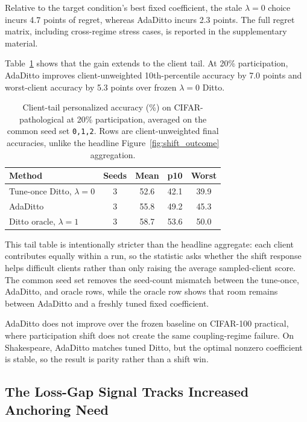 \documentclass[letterpaper]{article} %
\begin{document}
Relative to the target condition's best fixed coefficient, the stale
$\lambda=0$ choice incurs 4.7 points of regret, whereas AdaDitto
incurs 2.3 points. The full regret matrix, including cross-regime
stress cases, is reported in the supplementary material.

Table~\ref{tab:client-tail} shows that the gain extends to the client
tail. At 20\% participation,
AdaDitto improves client-unweighted 10th-percentile accuracy by
7.0 points and worst-client accuracy by 5.3 points over frozen
$\lambda=0$ Ditto.

\begin{table}[t]
\centering
\scriptsize
\setlength{\tabcolsep}{4pt}
\renewcommand{\arraystretch}{1.08}
\begin{tabularx}{\columnwidth}{@{}>{\raggedright\arraybackslash}Xcccc@{}}
\toprule
Method & Seeds & Mean & p10 & Worst \\
\midrule
Tune-once Ditto, $\lambda=0$ & 3 & 52.6 & 42.1 & 39.9 \\
AdaDitto & 3 & 55.8 & 49.2 & 45.3 \\
Ditto oracle, $\lambda=1$ & 3 & 58.7 & 53.6 & 50.0 \\
\bottomrule
\end{tabularx}
\caption{Client-tail personalized accuracy (\%) on CIFAR-pathological at 20\% participation, averaged on the common seed set \texttt{0,1,2}. Rows are client-unweighted final accuracies, unlike the headline Figure~\ref{fig:shift_outcome} aggregation.}
\label{tab:client-tail}
\end{table}

This tail table is intentionally stricter than the headline aggregate:
each client contributes equally within a run, so the statistic asks
whether the shift response helps difficult clients rather than only
raising the average sampled-client score. The common seed set removes
the seed-count mismatch between the tune-once, AdaDitto, and oracle
rows, while the oracle row shows that room remains between AdaDitto
and a freshly tuned fixed coefficient.

AdaDitto does not improve over the frozen baseline on CIFAR-100
practical, where participation shift does not create the same
coupling-regime failure. On Shakespeare, AdaDitto matches tuned
Ditto, but the optimal nonzero coefficient is stable, so the result
is parity rather than a shift win.

\subsection{The Loss-Gap Signal Tracks Increased Anchoring Need}
\end{document}
